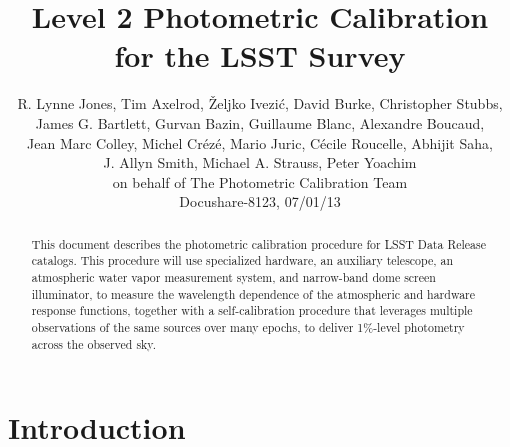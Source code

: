 \documentclass[12pt,preprint]{aastex}
\begin{document}
\title{Level 2 Photometric Calibration for the LSST Survey}

\author{
R. Lynne Jones, Tim Axelrod,
{\v Z}eljko Ivezi{\'c},   David Burke, Christopher Stubbs, \\
James G. Bartlett,
Gurvan Bazin,
Guillaume Blanc,
Alexandre Boucaud, \\
Jean Marc Colley, 
Michel Cr{\'e}z{\'e},  
Mario Juric,
C{\'e}cile Roucelle, 
Abhijit Saha, \\
J. Allyn Smith, 
Michael A. Strauss,
Peter Yoachim \\
on behalf of 
The Photometric Calibration Team \\ 
Docushare-8123, 07/01/13 \\
}



\begin{abstract}
This document describes the photometric calibration procedure for LSST
Data Release catalogs. This procedure will use specialized hardware, 
an auxiliary telescope, an atmospheric water vapor measurement system, and narrow-band dome screen illuminator, to
measure the wavelength dependence of the atmospheric and hardware
response functions, together with a self-calibration procedure that
leverages multiple observations of the same sources over many epochs,
to deliver 1\%-level photometry across the observed sky.
\end{abstract}

\tableofcontents

\section{Introduction}
\end{document}
